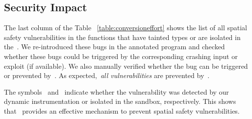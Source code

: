 


\subsection{Security Impact}
\label{subsec:securityimpact}
The last column of the Table ~\ref{table:conversioneffort} shows the list of all spatial safety vulnerabilities in the functions that have tainted types or are isolated in the~\ucregion{}.
We re-introduced these bugs in the annotated program and checked whether these bugs could be triggered by the corresponding crashing input or exploit (if available).
We also manually verified whether the bug can be triggered or prevented by~\systemname{}.
As expected,~\emph{all vulnerabilities} are prevented by~\systemname{}.

The symbols~\vulprevented{} and~\vulisolated{} indicate whether the vulnerability was detected by our dynamic instrumentation or isolated in the sandbox, respectively.
This shows that~\systemname{} provides an effective mechanism to prevent spatial safety vulnerabilities.

% 


